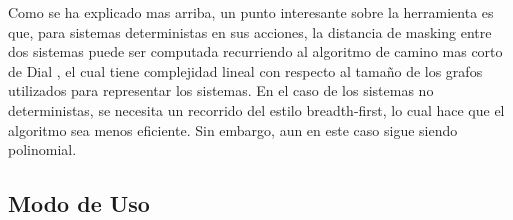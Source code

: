 Como se ha explicado mas arriba, un punto interesante sobre la herramienta es que, para sistemas deterministas en sus acciones, la distancia de masking entre dos sistemas puede ser computada recurriendo al algoritmo de camino mas corto de Dial \cite{Dial69}, el cual tiene complejidad lineal con respecto al tamaño de los grafos utilizados para representar los sistemas.
En el caso de los sistemas no deterministas, se necesita un recorrido del estilo 
breadth-first, lo cual hace que el algoritmo sea menos eficiente. Sin embargo, aun en este caso sigue siendo polinomial. 



\subsection{Modo de Uso}

